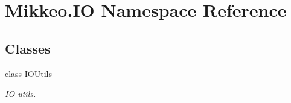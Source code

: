 \hypertarget{namespace_mikkeo_1_1_i_o}{}\section{Mikkeo.\+IO Namespace Reference}
\label{namespace_mikkeo_1_1_i_o}
\subsection*{Classes}
\begin{DoxyCompactItemize}
\item 
class \hyperlink{class_mikkeo_1_1_i_o_1_1_i_o_utils}{I\+O\+Utils}
\begin{DoxyCompactList}\small\item\em \hyperlink{namespace_mikkeo_1_1_i_o}{IO} utils. \end{DoxyCompactList}\end{DoxyCompactItemize}
